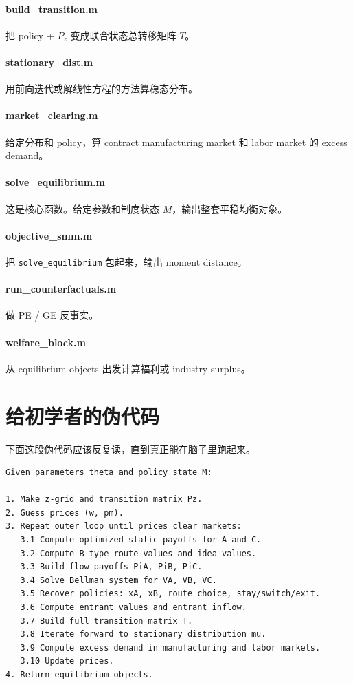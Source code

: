 \documentclass[12pt]{ctexart}
\begin{document}
\paragraph{build\_transition.m}
把 policy + $P_z$ 变成联合状态总转移矩阵 $T$。

\paragraph{stationary\_dist.m}
用前向迭代或解线性方程的方法算稳态分布。

\paragraph{market\_clearing.m}
给定分布和 policy，算 contract manufacturing market 和 labor market 的 excess demand。

\paragraph{solve\_equilibrium.m}
这是核心函数。给定参数和制度状态 $M$，输出整套平稳均衡对象。

\paragraph{objective\_smm.m}
把 \texttt{solve\_equilibrium} 包起来，输出 moment distance。

\paragraph{run\_counterfactuals.m}
做 PE / GE 反事实。

\paragraph{welfare\_block.m}
从 equilibrium objects 出发计算福利或 industry surplus。

\section{给初学者的伪代码}

下面这段伪代码应该反复读，直到真正能在脑子里跑起来。

\begin{verbatim}
Given parameters theta and policy state M:

1. Make z-grid and transition matrix Pz.
2. Guess prices (w, pm).
3. Repeat outer loop until prices clear markets:
   3.1 Compute optimized static payoffs for A and C.
   3.2 Compute B-type route values and idea values.
   3.3 Build flow payoffs PiA, PiB, PiC.
   3.4 Solve Bellman system for VA, VB, VC.
   3.5 Recover policies: xA, xB, route choice, stay/switch/exit.
   3.6 Compute entrant values and entrant inflow.
   3.7 Build full transition matrix T.
   3.8 Iterate forward to stationary distribution mu.
   3.9 Compute excess demand in manufacturing and labor markets.
   3.10 Update prices.
4. Return equilibrium objects.
\end{verbatim}
\end{document}
